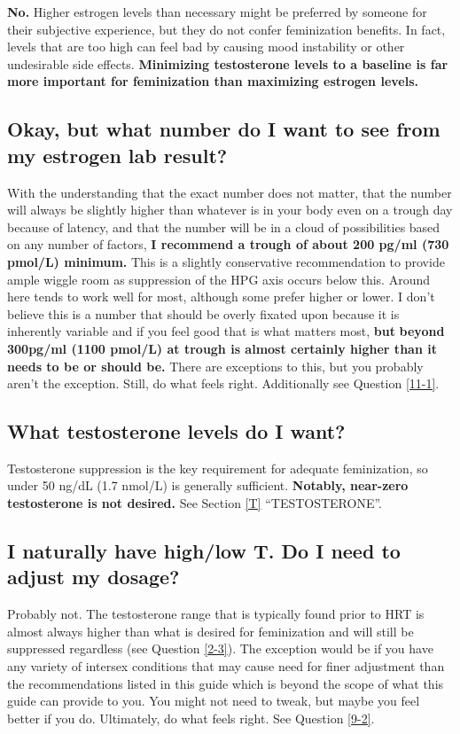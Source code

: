 \documentclass{article}
\begin{document}
\textbf{No.} Higher estrogen levels than necessary might be preferred by someone for their subjective experience, but they do not confer feminization benefits. In fact, levels that are too high can feel bad by causing mood instability or other undesirable side effects. \textbf{Minimizing testosterone levels to a baseline is far more important for feminization than maximizing estrogen levels.}

\subsection{Okay, but what number do I want to see from my estrogen lab result?}

With the understanding that the exact number does not matter, that the number will always be slightly higher than whatever is in your body even on a trough day because of latency, and that the number will be in a cloud of possibilities based on any number of factors, \textbf{I recommend a trough of about 200 pg/ml (730 pmol/L) minimum.} This is a slightly conservative recommendation to provide ample wiggle room as suppression of the HPG axis occurs below this. Around here tends to work well for most, although some prefer higher or lower. I don’t believe this is a number that should be overly fixated upon because it is inherently variable and if you feel good that is what matters most, \textbf{but} \textbf{beyond 300pg/ml (1100 pmol/L) at trough is almost certainly higher than it needs to be or should be.} There are exceptions to this, but you probably aren't the exception. Still, do what feels right. Additionally see Question \ref{11-1}.

\subsection{What testosterone levels do I want?}

Testosterone suppression is the key requirement for adequate feminization, so under 50 ng/dL (1.7 nmol/L) is generally sufficient. \textbf{Notably, near-zero testosterone is not desired.} See Section \ref{T} “TESTOSTERONE”.

\subsection{I naturally have high/low T. Do I need to adjust my dosage?}

Probably not. The testosterone range that is typically found prior to HRT is almost always higher than what is desired for feminization and will still be suppressed regardless (see Question \ref{2-3}). The exception would be if you have any variety of intersex conditions that may cause need for finer adjustment than the recommendations listed in this guide which is beyond the scope of what this guide can provide to you. You might not need to tweak, but maybe you feel better if you do. Ultimately, do what feels right. See Question \ref{9-2}.
\end{document}
